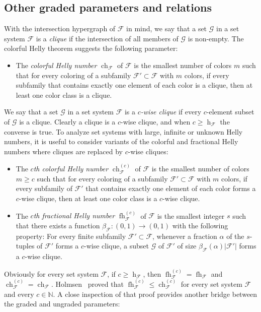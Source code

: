 \documentclass[11pt]{article}
\newcommand{\N}{\mathbb{N}}
\newcommand{\F}{\mathcal{F}}
\newcommand{\G}{\mathcal{G}}
\DeclareMathOperator{\h}{h}
\DeclareMathOperator{\ch}{ch}
\DeclareMathOperator{\fh}{fh}
\newcommand{\defn}[1]{\emph{\color{violet}#1}}
\begin{document}
\subsection{Other graded parameters and relations}\label{s:graded2}
%
With the intersection hypergraph of $\F$ in mind, we say that a set $\G$ in a set system $\F$ is a \defn{clique} if the intersection of all members of $\G$ is non-empty. The colorful Helly theorem suggests the following parameter:
%
\begin{itemize}
\item The \defn{colorful Helly number} $\ch_\F$ of $\F$ is the smallest number of colors $m$ such that for every coloring of a subfamily $\F'\subset \F$ with $m$ colors, if every subfamily that contains exactly one element of each color is a clique, then at least one color class is a clique.
\end{itemize}
%
\noindent
We say that a set $\G$ in a set system $\F$ is a \defn{$c$-wise clique} if every $c$-element subset of $\G$ is a clique. Clearly a clique is a $c$-wise clique, and when $c \ge \h_\F$ the converse is true. To analyze  set systems with large, infinite or unknown Helly numbers, it is useful to consider variants of the colorful and fractional Helly numbers where cliques are replaced by $c$-wise cliques:
%
\begin{itemize}
\item The \defn{$c$th colorful Helly number} $\ch^{(c)}_\F$ of $\F$ is the smallest number of colors $m \geq c$ such that for every coloring of a subfamily $\F'\subset \F$ with $m$ colors, if every subfamily of $\F'$ that contains exactly one element of each color forms a $c$-wise clique, then at least one color class is a $c$-wise clique.\medskip
%
\item The \defn{$c$th fractional Helly number} $\fh^{(c)}_\F$ of $\F$ is the smallest integer $s$ such that there exists a function $\beta_\F:(0,1)\rightarrow (0,1)$ with the following property: For every finite subfamily $\F'\subset \F$, whenever a fraction $\alpha$ of the $s$-tuples of $\F'$ forms a $c$-wise clique, a subset $\G$ of $\F'$ of size $\beta_\F(\alpha)|\F'|$ forms a $c$-wise clique. \medskip
\end{itemize}
%
\noindent
Obviously for every set system $\F$, if $c \ge \h_\F$, then $\fh^{(c)}_\F = \fh_\F$ and $\ch^{(c)}_\F = \ch_\F$. Holmsen~\cite[Theorem~1.2]{Holmsen2020} proved that $\fh^{(c)}_\F\leq \ch^{(c)}_\F$ for every set system $\F$ and every $c\in\N$. A close inspection of that proof provides another bridge between the graded and ungraded parameters:
\end{document}
